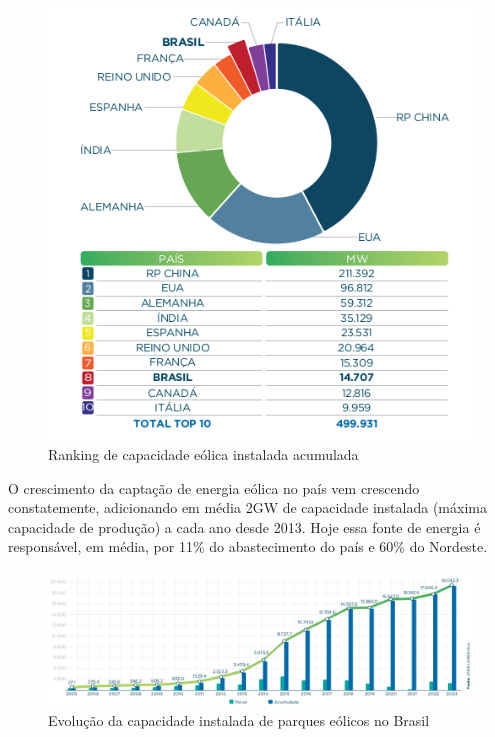 \documentclass[
	12pt,				%
	openright,			%
	oneside,			%
	a4paper,			%
	english,			%
	french,				%
	spanish,			%
	brazil				%
	]{abntex2}
\begin{document}
\begin{figure}[h]
    \centering
	\includegraphics[scale=0.6]{abe_maiores_produtores}
	\caption{Ranking de capacidade eólica instalada acumulada}
\end{figure}
\FloatBarrier

O crescimento da captação de energia eólica no país vem crescendo constatemente, adicionando em média 2GW de capacidade instalada (máxima capacidade de produção) a cada ano desde 2013. Hoje essa fonte de energia é responsável, em média, por 11\% do abastecimento do país e 60\% do Nordeste.

\begin{figure}[h]
    \centering
	\includegraphics[width=\textwidth]{abe_evolucao_capacidade_instalada}
	\caption{Evolução da capacidade instalada de parques eólicos no Brasil}
\end{figure}
\FloatBarrier
\end{document}
